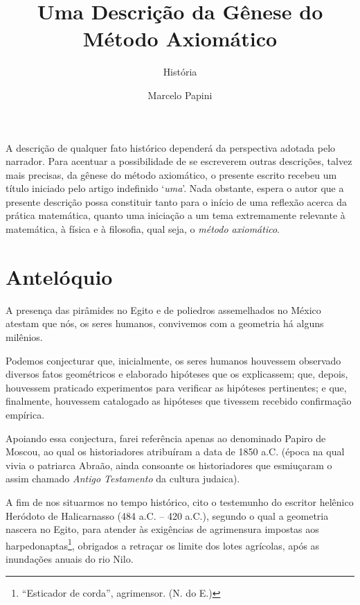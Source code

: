\documentclass{hipatia}
\title{Uma Descrição da Gênese do\\ Método Axiomático}
\subtitle{História}
\author{Marcelo Papini
}
\begin{document}
\setcounter{page}{\historiapage}
\maketitle


A descrição de qualquer fato histórico dependerá da perspectiva adotada pelo narrador. Para acentuar a possibilidade de se escreverem outras descrições, talvez mais precisas, da gênese do método axiomático, o presente escrito recebeu um título iniciado pelo artigo indefinido ‘\emph{uma}’.
Nada obstante, espera o autor que a presente descrição possa constituir tanto para o início de uma reflexão acerca da prática matemática, quanto uma iniciação a um tema extremamente relevante à matemática, à física e à filosofia, qual seja, o \emph{método axiomático}.







\section{Antelóquio}

A presença das pirâmides no Egito e de poliedros assemelhados no México atestam que nós, os seres humanos, convivemos  com a geometria há alguns milênios. 

Podemos conjecturar que, inicialmente, os seres humanos houvessem observado diversos fatos geométricos e elaborado hipóteses que os explicassem;  que, depois, houvessem praticado experimentos para verificar as hipóteses pertinentes;  e que, finalmente, houvessem catalogado as hipóteses que tivessem recebido confirmação empírica. 

Apoiando essa conjectura, farei referência apenas ao denominado Papiro de Moscou, ao qual os historiadores atribuíram a data de 1850 a.C.  (época na qual vivia o patriarca Abraão, ainda consoante os historiadores que esmiuçaram o assim chamado \emph{Antigo Testamento} da cultura judaica).

A fim de nos situarmos no tempo histórico, cito o testemunho do escritor helênico Heródoto de Halicarnasso (484 a.C. – 420 a.C.), segundo o qual a geometria nascera no Egito, para atender às exigências de agrimensura impostas aos harpedonaptas\footnote{``Esticador de corda'', agrimensor. (N. do E.)}, obrigados a retraçar os limite dos lotes agrícolas, após as inundações anuais do rio Nilo. 
\end{document}
